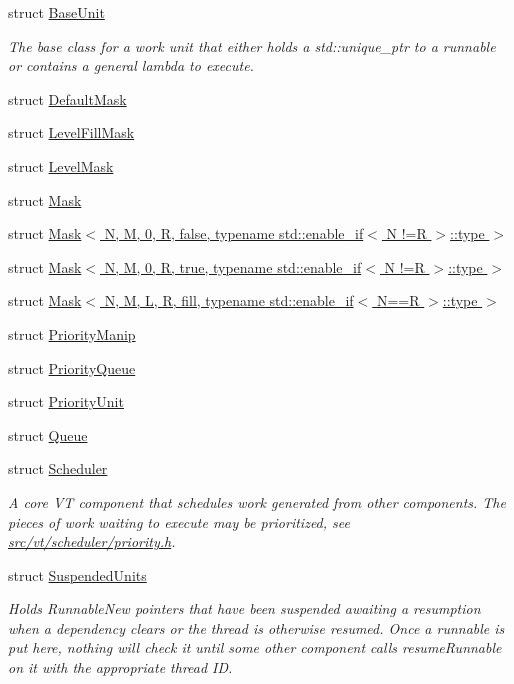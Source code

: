\begin{DoxyCompactItemize}
\item 
struct \hyperlink{structvt_1_1sched_1_1_base_unit}{Base\+Unit}
\begin{DoxyCompactList}\small\item\em The base class for a work unit that either holds a {\ttfamily std\+::unique\+\_\+ptr} to a runnable or contains a general lambda to execute. \end{DoxyCompactList}\item 
struct \hyperlink{structvt_1_1sched_1_1_default_mask}{Default\+Mask}
\item 
struct \hyperlink{structvt_1_1sched_1_1_level_fill_mask}{Level\+Fill\+Mask}
\item 
struct \hyperlink{structvt_1_1sched_1_1_level_mask}{Level\+Mask}
\item 
struct \hyperlink{structvt_1_1sched_1_1_mask}{Mask}
\item 
struct \hyperlink{structvt_1_1sched_1_1_mask_3_01_n_00_01_m_00_010_00_01_r_00_01false_00_01typename_01std_1_1enabl81bb113ca3757a124cb0c647589aa3dd}{Mask$<$ N, M, 0, R, false, typename std\+::enable\+\_\+if$<$ N !=\+R $>$\+::type $>$}
\item 
struct \hyperlink{structvt_1_1sched_1_1_mask_3_01_n_00_01_m_00_010_00_01_r_00_01true_00_01typename_01std_1_1enable84a8b0b373fb69b0fca50672234c2a86}{Mask$<$ N, M, 0, R, true, typename std\+::enable\+\_\+if$<$ N !=\+R $>$\+::type $>$}
\item 
struct \hyperlink{structvt_1_1sched_1_1_mask_3_01_n_00_01_m_00_01_l_00_01_r_00_01fill_00_01typename_01std_1_1enablb425bc242171a4de39f2db76b78da09f}{Mask$<$ N, M, L, R, fill, typename std\+::enable\+\_\+if$<$ N==\+R $>$\+::type $>$}
\item 
struct \hyperlink{structvt_1_1sched_1_1_priority_manip}{Priority\+Manip}
\item 
struct \hyperlink{structvt_1_1sched_1_1_priority_queue}{Priority\+Queue}
\item 
struct \hyperlink{structvt_1_1sched_1_1_priority_unit}{Priority\+Unit}
\item 
struct \hyperlink{structvt_1_1sched_1_1_queue}{Queue}
\item 
struct \hyperlink{structvt_1_1sched_1_1_scheduler}{Scheduler}
\begin{DoxyCompactList}\small\item\em A core VT component that schedules work generated from other components. The pieces of work waiting to execute may be prioritized, see \hyperlink{priority_8h}{src/vt/scheduler/priority.\+h}. \end{DoxyCompactList}\item 
struct \hyperlink{structvt_1_1sched_1_1_suspended_units}{Suspended\+Units}
\begin{DoxyCompactList}\small\item\em Holds {\ttfamily Runnable\+New} pointers that have been suspended awaiting a resumption when a dependency clears or the thread is otherwise resumed. Once a runnable is put here, nothing will check it until some other component calls {\ttfamily resume\+Runnable} on it with the appropriate thread ID. \end{DoxyCompactList}\end{DoxyCompactItemize}
